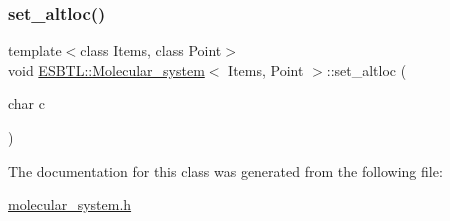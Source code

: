 \mbox{\label{classESBTL_1_1Molecular__system_abc7e6c6b54f09eebeace5cc88bd2c981}} 
\subsubsection{\texorpdfstring{set\+\_\+altloc()}{set\_altloc()}}
{\footnotesize\ttfamily template$<$class Items, class Point$>$ \\
void \hyperlink{classESBTL_1_1Molecular__system}{E\+S\+B\+T\+L\+::\+Molecular\+\_\+system}$<$ Items, Point $>$\+::set\+\_\+altloc (\begin{DoxyParamCaption}\item[{char}]{c }\end{DoxyParamCaption})\hspace{0.3cm}{\ttfamily [inline]}}



The documentation for this class was generated from the following file\+:\begin{DoxyCompactItemize}
\item 
\hyperlink{molecular__system_8h}{molecular\+\_\+system.\+h}\end{DoxyCompactItemize}
